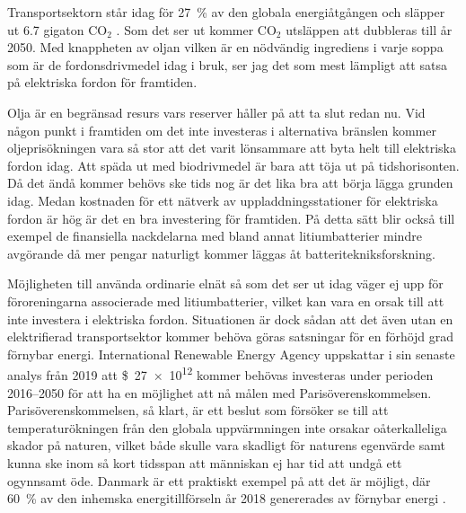 \documentclass{article}
\begin{document}
Transportsektorn står idag för \SI{27}{\percent} av den globala energiåtgången
och släpper ut \num{6.7} gigaton CO$_2$ \autocite{edenhofer15}.
Som det ser ut kommer CO$_2$ utsläppen att dubbleras till år 2050.
Med knappheten av oljan
vilken är en nödvändig ingrediens i varje soppa som är de fordonsdrivmedel idag i bruk,
ser jag det som mest lämpligt att satsa på elektriska fordon för framtiden.

Olja är en begränsad resurs vars reserver håller på att ta slut redan nu.
Vid någon punkt i framtiden om det inte investeras i alternativa bränslen
kommer oljeprisökningen vara så stor att det varit lönsammare att byta helt
till elektriska fordon idag.
Att späda ut med biodrivmedel är bara att töja ut på tidshorisonten.
Då det ändå kommer behövs ske tids nog är det lika bra att börja lägga grunden idag.
Medan kostnaden för ett nätverk av uppladdningsstationer för elektriska fordon
är hög är det en bra investering för framtiden.
På detta sätt blir också till exempel de finansiella nackdelarna med
bland annat litiumbatterier mindre avgörande då
mer pengar naturligt kommer läggas åt batteritekniksforskning.

Möjligheten till använda ordinarie elnät så som det ser ut idag
väger ej upp för föroreningarna associerade med litiumbatterier,
vilket kan vara en orsak till att inte investera i elektriska fordon.
Situationen är dock sådan att det även utan en elektrifierad transportsektor
kommer behöva göras satsningar för en förhöjd grad förnybar energi.
International Renewable Energy Agency uppskattar i sin senaste analys från 2019 \autocite{gielen19}
att \SI{27e12}[\$]{} kommer behövas investeras under perioden \numrange{2016}{2050}
för att ha en möjlighet att nå målen med Parisöverenskommelsen.
Parisöverenskommelsen, så klart, är ett beslut som försöker se till att
temperaturökningen från den globala uppvärmningen
inte orsakar oåterkalleliga skador på naturen,
vilket både skulle vara skadligt för naturens egenvärde
samt kunna ske inom så kort tidsspan att människan ej har tid
att undgå ett ogynnsamt öde.
Danmark är ett praktiskt exempel på att det är möjligt,
där \SI{60}{\percent} av den inhemska energitillförseln år 2018 genererades av förnybar energi
\autocite{energyindenmark2018}.
\end{document}
